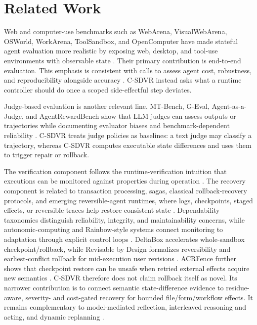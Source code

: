 \documentclass[pdflatex,sn-apa]{sn-jnl}
\begin{document}
\section{Related Work}

Web and computer-use benchmarks such as WebArena, VisualWebArena, OSWorld, WorkArena, ToolSandbox, and OpenComputer have made stateful agent evaluation more realistic by exposing web, desktop, and tool-use environments with observable state \cite{zhou2023webarena,koh2024visualwebarena,xie2024osworld,drouin2024workarena,lu2024toolsandbox,wei2026opencomputer}. Their primary contribution is end-to-end evaluation. This emphasis is consistent with calls to assess agent cost, robustness, and reproducibility alongside accuracy \cite{kapoor2024agents}. C-SDVR instead asks what a runtime controller should do once a scoped side-effectful step deviates.

Judge-based evaluation is another relevant line. MT-Bench, G-Eval, Agent-as-a-Judge, and AgentRewardBench show that LLM judges can assess outputs or trajectories while documenting evaluator biases and benchmark-dependent reliability \cite{zheng2023llmjudge,liu2023geval,zhuge2024agentjudge,lu2025agentrewardbench}. C-SDVR treats judge policies as baselines: a text judge may classify a trajectory, whereas C-SDVR computes executable state differences and uses them to trigger repair or rollback.

The verification component follows the runtime-verification intuition that executions can be monitored against properties during operation \cite{leucker2009runtime,havelund2004javapathexplorer}. The recovery component is related to transaction processing, sagas, classical rollback-recovery protocols, and emerging reversible-agent runtimes, where logs, checkpoints, staged effects, or reversible traces help restore consistent state \cite{gray1992transaction,garciamolina1987sagas,elnozahy2002rollback,fokou2026parallax,chen2026cordon,yu2026shepherd}. Dependability taxonomies distinguish reliability, integrity, and maintainability concerns, while autonomic-computing and Rainbow-style systems connect monitoring to adaptation through explicit control loops \cite{avizienis2004dependability,kephart2003autonomic,garlan2004rainbow}. DeltaBox accelerates whole-sandbox checkpoint/rollback, while Revisable by Design formalizes reversibility and earliest-conflict rollback for mid-execution user revisions \cite{dong2026deltabox,zhai2026revisable}. ACRFence further shows that checkpoint restore can be unsafe when retried external effects acquire new semantics \cite{zheng2026acrfence}. C-SDVR therefore does not claim rollback itself as novel. Its narrower contribution is to connect semantic state-difference evidence to residue-aware, severity- and cost-gated recovery for bounded file/form/workflow effects. It remains complementary to model-mediated reflection, interleaved reasoning and acting, and dynamic replanning \cite{shinn2023reflexion,yao2023react,zhu2026whentoolsfail}.
\end{document}
